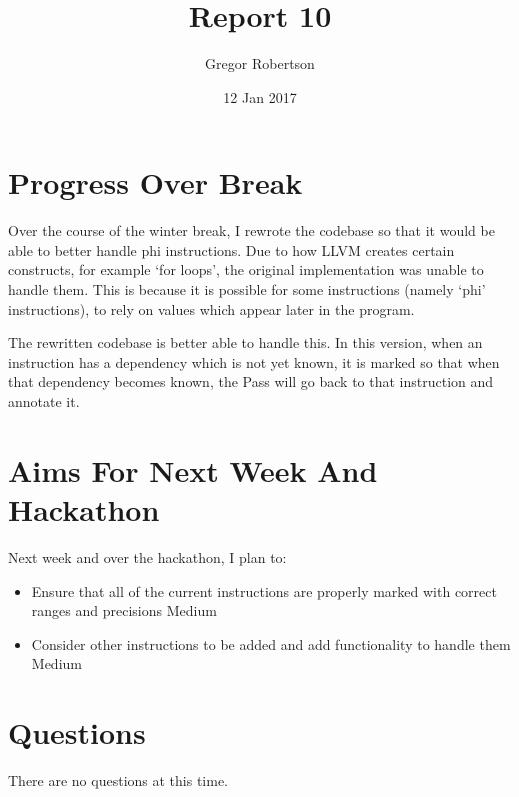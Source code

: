 \documentclass{article}
\title{Report 10}
\author{Gregor Robertson}
\date{12 Jan 2017}
\begin{document}
 
\maketitle
 
\section*{Progress Over Break}
Over the course of the winter break, I rewrote the codebase so that it would be able to better handle phi instructions. Due to how LLVM creates certain constructs, for example `for loops', the original implementation was unable to handle them. This is because it is possible for some instructions (namely `phi' instructions), to rely on values which appear later in the program. 

The rewritten codebase is better able to handle this. In this version, when an instruction has a dependency which is not yet known, it is marked so that when that dependency becomes known, the Pass will go back to that instruction and annotate it. 

\section*{Aims For Next Week And Hackathon}
Next week and over the hackathon, I plan to:
\begin{itemize}
	\item Ensure that all of the current instructions are properly marked with correct ranges and precisions \colorbox{BurntOrange}{\color{Black}Medium}
	\item Consider other instructions to be added and add functionality to handle them \colorbox{BurntOrange}{\color{Black}Medium}
\end{itemize}

\section*{Questions}
There are no questions at this time.

\medskip
 
\printbibliography
\end{document}
